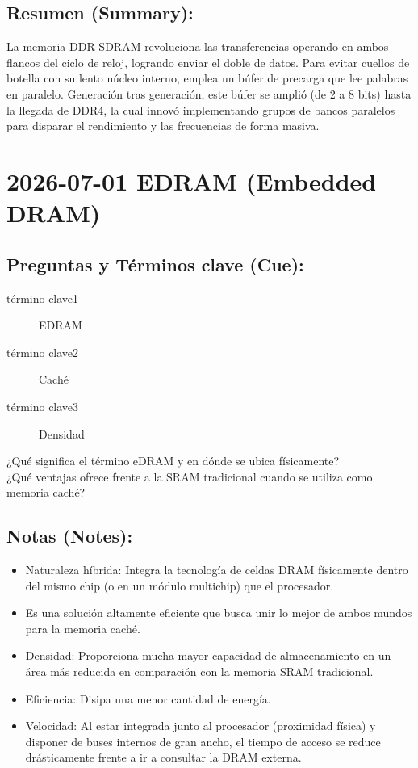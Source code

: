 \documentclass{article}
\begin{document}
\subsection{Resumen (Summary):}
\label{sec:org9223dd0}
La memoria DDR SDRAM revoluciona las transferencias operando en ambos 
flancos del ciclo de reloj, logrando enviar el doble de datos. Para 
evitar cuellos de botella con su lento núcleo interno, emplea un búfer 
de precarga que lee palabras en paralelo. Generación tras generación, 
este búfer se amplió (de 2 a 8 bits) hasta la llegada de DDR4, la cual 
innovó implementando grupos de bancos paralelos para disparar el 
rendimiento y las frecuencias de forma masiva.

\section{2026-07-01 EDRAM (Embedded DRAM)}
\label{sec:org4f2ae1a}

\subsection{Preguntas y Términos clave (Cue):}
\label{sec:org9308f4d}
\begin{description}
\item[{término clave1}] EDRAM
\item[{término clave2}] Caché
\item[{término clave3}] Densidad
\item[{¿Qué significa el término eDRAM y en dónde se ubica físicamente?}] 

\item[{¿Qué ventajas ofrece frente a la SRAM tradicional cuando se utiliza como memoria caché?}] 
\end{description}

\subsection{Notas (Notes):}
\label{sec:org7c4c854}
\begin{itemize}
\item Naturaleza híbrida: Integra la tecnología de celdas DRAM físicamente
dentro del mismo chip (o en un módulo multichip) que el procesador.
\item Es una solución altamente eficiente que busca unir lo mejor de ambos 
mundos para la memoria caché.
\item Densidad: Proporciona mucha mayor capacidad de almacenamiento en un
área más reducida en comparación con la memoria SRAM tradicional.
\item Eficiencia: Disipa una menor cantidad de energía.
\item Velocidad: Al estar integrada junto al procesador (proximidad física)
y disponer de buses internos de gran ancho, el tiempo de acceso se 
reduce drásticamente frente a ir a consultar la DRAM externa.
\end{itemize}
\end{document}
